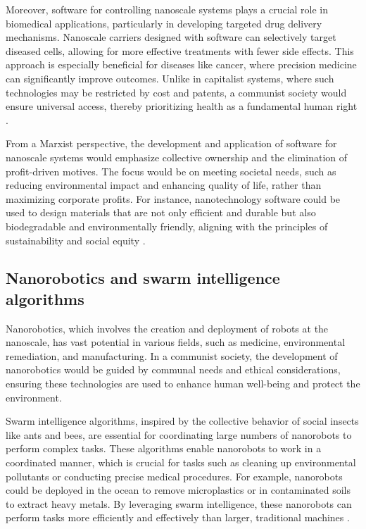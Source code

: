Moreover, software for controlling nanoscale systems plays a crucial role in biomedical applications, particularly in developing targeted drug delivery mechanisms. Nanoscale carriers designed with software can selectively target diseased cells, allowing for more effective treatments with fewer side effects. This approach is especially beneficial for diseases like cancer, where precision medicine can significantly improve outcomes. Unlike in capitalist systems, where such technologies may be restricted by cost and patents, a communist society would ensure universal access, thereby prioritizing health as a fundamental human right \cite[pp.~167-173]{freitas1999nanomedicine}.

From a Marxist perspective, the development and application of software for nanoscale systems would emphasize collective ownership and the elimination of profit-driven motives. The focus would be on meeting societal needs, such as reducing environmental impact and enhancing quality of life, rather than maximizing corporate profits. For instance, nanotechnology software could be used to design materials that are not only efficient and durable but also biodegradable and environmentally friendly, aligning with the principles of sustainability and social equity \cite[pp.~134-140]{ratner2003nanotechnology}.

\subsection{Nanorobotics and swarm intelligence algorithms}

Nanorobotics, which involves the creation and deployment of robots at the nanoscale, has vast potential in various fields, such as medicine, environmental remediation, and manufacturing. In a communist society, the development of nanorobotics would be guided by communal needs and ethical considerations, ensuring these technologies are used to enhance human well-being and protect the environment.

Swarm intelligence algorithms, inspired by the collective behavior of social insects like ants and bees, are essential for coordinating large numbers of nanorobots to perform complex tasks. These algorithms enable nanorobots to work in a coordinated manner, which is crucial for tasks such as cleaning up environmental pollutants or conducting precise medical procedures. For example, nanorobots could be deployed in the ocean to remove microplastics or in contaminated soils to extract heavy metals. By leveraging swarm intelligence, these nanorobots can perform tasks more efficiently and effectively than larger, traditional machines \cite[pp.~220-225]{freitas2005nanomedicine}.


